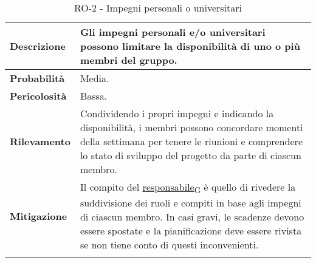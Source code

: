 \newpage


\begin{longtable}{ | l | p{12cm} | }
	\hline
	\textbf{Descrizione}  & Gli impegni personali e/o universitari possono limitare la disponibilità di uno o più membri del gruppo.                                                                                                                                                           \\
	\hline
	\textbf{Probabilità}  & Media.                                                                                                                                                                                                                                                             \\
	\hline
	\textbf{Pericolosità} & Bassa.                                                                                                                                                                                                                                                             \\
	\hline
	\textbf{Rilevamento}  & Condividendo i propri impegni e indicando la disponibilità, i membri possono concordare momenti della settimana per tenere le riunioni e comprendere lo stato di sviluppo del progetto da parte di ciascun membro.                                                 \\
	\hline
	\textbf{Mitigazione}  & Il compito del \href{https://7last.github.io/docs/rtb/documentazione-interna/glossario\#responsabile}{responsabile\textsubscript{G}} è quello di rivedere la suddivisione dei ruoli e compiti in base agli impegni di ciascun membro. In casi gravi, le scadenze devono essere spostate e la pianificazione deve essere rivista se non tiene conto di questi inconvenienti. \\
	\hline
	\caption{RO-2 - Impegni personali o universitari}
\end{longtable}


